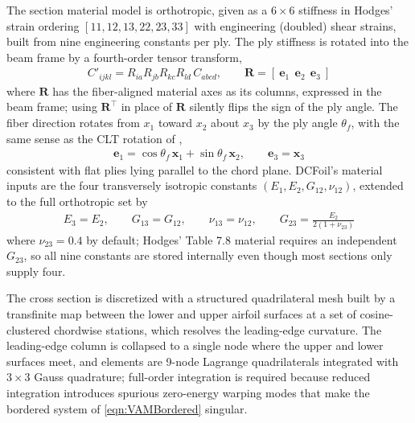 \documentclass[10pt]{article}
\newcommand{\mbf}[1]{\mathbf{#1}}
\newcommand{\beq}{\begin{equation}\begin{aligned}}
\newcommand{\eeq}{\end{aligned}\end{equation}}
\begin{document}
The section material model is orthotropic, given as a $6\times6$ stiffness in Hodges' strain ordering $[11,12,13,22,23,33]$ with engineering (doubled) shear strains, built from nine engineering constants per ply.
The ply stiffness is rotated into the beam frame by a fourth-order tensor transform,
\beq
C'_{ijkl} = R_{ia}R_{jb}R_{kc}R_{ld}\,C_{abcd}, \qquad \mbf{R} = [\ \mbf{e}_1\ \ \mbf{e}_2\ \ \mbf{e}_3\ ]
\label{eqn:VAMRotation}
\eeq
where $\mbf{R}$ has the fiber-aligned material axes as its columns, expressed in the beam frame; using $\mbf{R}^\top$ in place of $\mbf{R}$ silently flips the sign of the ply angle.
The fiber direction rotates from $x_1$ toward $x_2$ about $x_3$ by the ply angle $\theta_f$, with the same sense as the \ac{CLT} rotation of \citet{Weisshaar1985},
\beq
\mbf{e}_1 = \cos\theta_f\, \mbf{x}_1 + \sin\theta_f\, \mbf{x}_2, \qquad \mbf{e}_3 = \mbf{x}_3
\label{eqn:VAMPlyAngle}
\eeq
consistent with flat plies lying parallel to the chord plane.
DCFoil's material inputs are the four transversely isotropic constants $(E_1, E_2, G_{12}, \nu_{12})$, extended to the full orthotropic set by
\beq
E_3 = E_2, \qquad G_{13} = G_{12}, \qquad \nu_{13} = \nu_{12}, \qquad G_{23} = \frac{E_2}{2(1+\nu_{23})}
\label{eqn:VAMTransverseIsotropy}
\eeq
where $\nu_{23} = 0.4$ by default; Hodges' Table 7.8 material requires an independent $G_{23}$, so all nine constants are stored internally even though most sections only supply four.

The cross section is discretized with a structured quadrilateral mesh built by a transfinite map between the lower and upper airfoil surfaces at a set of cosine-clustered chordwise stations, which resolves the leading-edge curvature.
The leading-edge column is collapsed to a single node where the upper and lower surfaces meet, and elements are 9-node Lagrange quadrilaterals integrated with $3\times3$ Gauss quadrature; full-order integration is required because reduced integration introduces spurious zero-energy warping modes that make the bordered system of \autoref{eqn:VAMBordered} singular.
\end{document}

